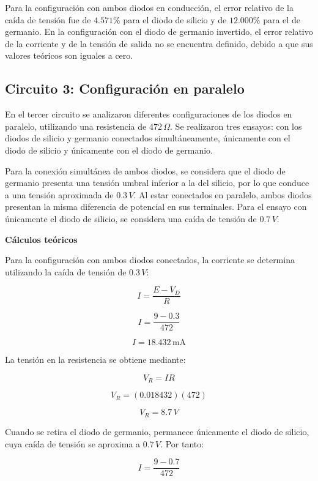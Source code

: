 \noindent
Para la configuración con ambos diodos en conducción, el error relativo de la caída de tensión fue de \(4.571\%\) para el diodo de silicio y de \(12.000\%\) para el de germanio. En la configuración con el diodo de germanio invertido, el error relativo de la corriente y de la tensión de salida no se encuentra definido, debido a que sus valores teóricos son iguales a cero.

\subsection{Circuito 3: Configuración en paralelo}

En el tercer circuito se analizaron diferentes configuraciones de los diodos en paralelo, utilizando una resistencia de \(472\,\Omega\). Se realizaron tres ensayos: con los diodos de silicio y germanio conectados simultáneamente, únicamente con el diodo de silicio y únicamente con el diodo de germanio.

\vspace{0.3cm}

Para la conexión simultánea de ambos diodos, se considera que el diodo de germanio presenta una tensión umbral inferior a la del silicio, por lo que conduce a una tensión aproximada de \(0.3\,V\). Al estar conectados en paralelo, ambos diodos presentan la misma diferencia de potencial en sus terminales. Para el ensayo con únicamente el diodo de silicio, se considera una caída de tensión de \(0.7\,V\).

\vspace{0.3cm}

\textbf{Cálculos teóricos}

Para la configuración con ambos diodos conectados, la corriente se determina utilizando la caída de tensión de \(0.3\,V\):

\[
I=\frac{E-V_D}{R}
\]

\[
I=\frac{9-0.3}{472}
\]

\[
\boxed{I=18.432\,\text{mA}}
\]

La tensión en la resistencia se obtiene mediante:

\[
V_R=IR
\]

\[
V_R=(0.018432)(472)
\]

\[
\boxed{V_R=8.7\,V}
\]

Cuando se retira el diodo de germanio, permanece únicamente el diodo de silicio, cuya caída de tensión se aproxima a \(0.7\,V\). Por tanto:

\[
I=\frac{9-0.7}{472}
\]

